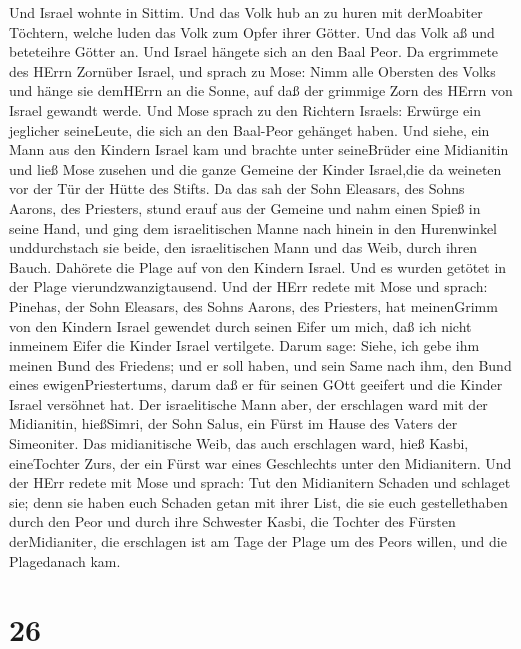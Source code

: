  Und Israel wohnte in Sittim. Und das Volk hub an zu huren
mit derMoabiter Töchtern,  welche luden das Volk zum Opfer
ihrer Götter. Und das Volk aß und beteteihre Götter an.  Und
Israel hängete sich an den Baal Peor. Da ergrimmete des HErrn Zornüber
Israel,  und sprach zu Mose: Nimm alle Obersten des Volks
und hänge sie demHErrn an die Sonne, auf daß der grimmige Zorn des HErrn
von Israel gewandt werde.  Und Mose sprach zu den Richtern
Israels: Erwürge ein jeglicher seineLeute, die sich an den Baal-Peor
gehänget haben.  Und siehe, ein Mann aus den Kindern Israel
kam und brachte unter seineBrüder eine Midianitin und ließ Mose zusehen
und die ganze Gemeine der Kinder Israel,die da weineten vor der Tür der
Hütte des Stifts.  Da das sah der Sohn Eleasars, des Sohns
Aarons, des Priesters, stund erauf aus der Gemeine und nahm einen Spieß
in seine Hand,  und ging dem israelitischen Manne nach
hinein in den Hurenwinkel unddurchstach sie beide, den israelitischen
Mann und das Weib, durch ihren Bauch. Dahörete die Plage auf von den
Kindern Israel.  Und es wurden getötet in der Plage
vierundzwanzigtausend.  Und der HErr redete mit Mose und
sprach:  Pinehas, der Sohn Eleasars, des Sohns Aarons, des
Priesters, hat meinenGrimm von den Kindern Israel gewendet durch seinen
Eifer um mich, daß ich nicht inmeinem Eifer die Kinder Israel
vertilgete.  Darum sage: Siehe, ich gebe ihm meinen Bund
des Friedens;  und er soll haben, und sein Same nach ihm,
den Bund eines ewigenPriestertums, darum daß er für seinen GOtt geeifert
und die Kinder Israel versöhnet hat.  Der israelitische
Mann aber, der erschlagen ward mit der Midianitin, hießSimri, der Sohn
Salus, ein Fürst im Hause des Vaters der Simeoniter.  Das
midianitische Weib, das auch erschlagen ward, hieß Kasbi, eineTochter
Zurs, der ein Fürst war eines Geschlechts unter den Midianitern.
 Und der HErr redete mit Mose und sprach:  Tut
den Midianitern Schaden und schlaget sie;  denn sie haben
euch Schaden getan mit ihrer List, die sie euch gestellethaben durch den
Peor und durch ihre Schwester Kasbi, die Tochter des Fürsten
derMidianiter, die erschlagen ist am Tage der Plage um des Peors willen,
und die Plagedanach kam.

\hypertarget{section-25}{%
\section{26}\label{section-25}}

